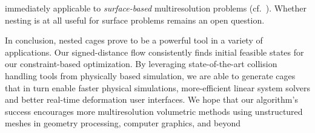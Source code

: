  immediately applicable to \emph{surface-based} multiresolution problems
(cf.\ \cite{Aksoylu2005msu,Chuang:2009:ELO}). Whether nesting is at all useful
for surface problems remains an open question.

In conclusion, nested cages prove to be a powerful tool in a variety of
applications. 
%
Our signed-distance flow consistently finds initial feasible states for our
constraint-based optimization.
%
By leveraging state-of-the-art collision handling tools from physically based
simulation, we are able to generate cages that in turn enable faster physical
simulations, more-efficient linear system solvers and better real-time
deformation user interfaces.
%
We hope that our algorithm's success encourages more multiresolution volumetric
methods using unstructured meshes in geometry processing, computer graphics,
and beyond
%

